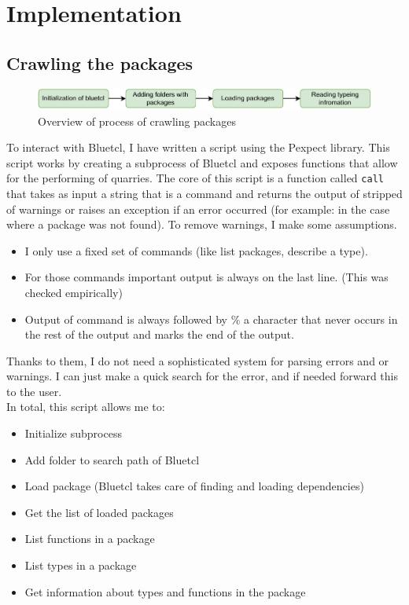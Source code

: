 \documentclass[12pt]{report}
\begin{document}
\chapter{Implementation}
\section{Crawling the packages}
\begin{figure}[!h]
    \centering
    \caption{Overview of process of crawling packages}

    \includegraphics[width=1.0\columnwidth]{pdfExports/LargeMap-Crawling.drawio.pdf}
\end{figure}
To interact with Bluetcl, I have written a script using the Pexpect library. This script works by creating a subprocess of Bluetcl and exposes functions that allow for the performing of quarries. The core of this script is a function called \verb!call! that takes as input a string that is a command and returns the output of stripped of warnings or raises an exception if an error occurred (for example: in the case where a package was not found). To remove warnings, I make some assumptions. 
\begin{itemize}
    \item I only use a fixed set of commands (like list packages, describe a type).  
    \item For those commands important output is always on the last line. (This was checked empirically)   
    \item Output of command is always followed by $\%$ a character that never occurs in the rest of the output and marks the end of the output.  
\end{itemize}   
Thanks to them, I do not need a sophisticated system for parsing errors and or warnings. I can just make a quick search for the error, and if needed forward this to the user.  
  \\   
In total, this script allows me to:   
\begin{itemize}   
\item Initialize subprocess   
\item Add folder to search path of Bluetcl   
\item Load package (Bluetcl takes care of finding and loading dependencies)   
\item Get the list of loaded packages   
\item List functions in a package   
\item List types in a package   
\item Get information about types and functions in the package   
\end{itemize} 
\end{document}
